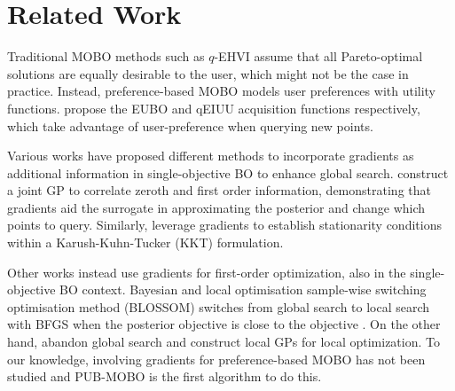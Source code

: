 \section{Related Work}
Traditional MOBO methods such as $q$-EHVI \cite{daulton2020differentiable} assume that all Pareto-optimal solutions are equally desirable to the user, which might not be the case in practice. Instead, preference-based MOBO models user preferences with utility functions. \citet{lin2022preference,astudillo20a} propose the EUBO and qEIUU acquisition functions respectively, which take advantage of user-preference when querying new points.

Various works have proposed different methods to incorporate gradients as additional information in single-objective BO to enhance global search. \citet{wu2017gradient} construct a joint GP to correlate zeroth and first order information, demonstrating that gradients aid the surrogate in approximating the posterior and change which points to query. Similarly, \citet{makrygiorgos2023no} leverage gradients to establish stationarity conditions within a Karush-Kuhn-Tucker (KKT) formulation.

Other works instead use gradients for first-order optimization, also in the single-objective BO context. Bayesian and local optimisation sample-wise switching optimisation method (BLOSSOM) switches from global search to local search with BFGS when the posterior objective is close to the objective \cite{mcleod2018optimization}. On the other hand, \cite{muller2021local, nguyen2022local} abandon global search and construct local GPs for local optimization. 
%
To our knowledge, involving gradients for preference-based MOBO has not been studied and PUB-MOBO is the first algorithm to do this.